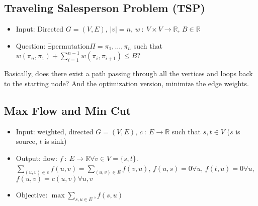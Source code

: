 \documentclass[10pt]{article}
\begin{document}
\subsection*{Traveling Salesperson Problem (TSP)}
\begin{itemize}
    \item Input: Directed $G = (V, E)$, $|v| = n$, $w \::\: V \times V \rightarrow \mathbb{R}$, $B \in \mathbb{R}$
    \item Question: $\exists \text{permutation} \Pi = \pi_1, \dots, \pi_n$ such that $w(\pi_n, \pi_1) + \sum_{i = 1}^{n - 1} w(\pi_i, \pi_{i + 1}) \leq B$?
\end{itemize}
Basically, does there exist a path passing through all the vertices and loops back to the starting node?  And the optimization version, minimize the edge weights.

\subsection*{Max Flow and Min Cut}
\begin{itemize}
    \item Input: weighted, directed $G = (V, E)$, $c \::\: E \rightarrow \mathbb{R}$ such that $s, t \in V$ ($s$ is source, $t$ is sink)
    \item Output: flow: $f \::\: E \rightarrow \mathbb{R} \forall v \in V = \{s, t\}$.  $\sum_{(u, v) \in e} f(u, v) = \sum_{(u, v) \in E} f(v, u)$, $f(u, s) = 0 \forall u$, $f(t, u) = 0 \forall u$, $f(u, v) = c(u, v) \forall u, v$
    \item Objective: $\max \sum_{s, u \in E}, f(s, u)$
\end{itemize}
\end{document}
